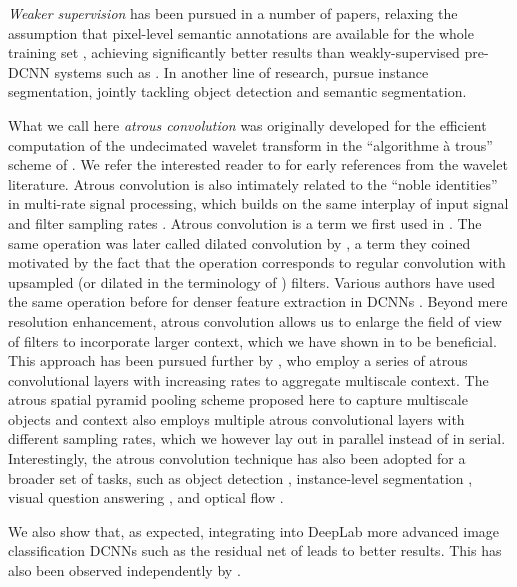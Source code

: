 \emph{Weaker supervision} has been pursued in a number of papers, relaxing
the assumption that pixel-level semantic annotations are available for the whole
training set \cite{pinheiro2014weakly, papandreou2015weakly, pathakICCV15ccnn, hong2015decoupled},
achieving significantly better results than weakly-supervised pre-DCNN systems
such as \cite{vezhnevets2011weakly}. In another line of research,
\cite{hariharan2014simultaneous, liang2015proposal} pursue instance segmentation, jointly tackling  object detection and semantic
segmentation.

What we call here \emph{atrous convolution} was originally developed for the efficient
computation of the undecimated wavelet transform in the ``algorithme \`a trous''
scheme of \cite{holschneider1989real}. We refer the interested reader to
\cite{fowler2005redundant} for early references from the wavelet literature.
Atrous convolution is also intimately related to the ``noble identities'' in
multi-rate signal processing, which builds on the same interplay of input signal
and filter sampling rates \cite{vaidyanathan1990multirate}. Atrous convolution
is a term we first used in \cite{papandreou2014untangling}. The same operation
was later called dilated convolution by \cite{yu2015multi}, a term they coined
motivated by the fact that the operation corresponds to regular convolution
with upsampled (or dilated in the terminology of \cite{holschneider1989real})
filters. Various authors have used the same operation before for denser feature
extraction in DCNNs \cite{giusti2013fast, sermanet2013overfeat, papandreou2014untangling}.
Beyond mere resolution enhancement, atrous convolution allows us to enlarge the
field of view of filters to incorporate larger context, which we have shown in
\cite{chen2014semantic} to be beneficial. This approach has been pursued further
by \cite{yu2015multi}, who employ a series of atrous convolutional layers with
increasing rates to aggregate multiscale context. The atrous spatial pyramid
pooling scheme proposed here to capture multiscale objects and context also
employs multiple atrous convolutional layers with different sampling rates,
which we however lay out in parallel instead of in serial.
Interestingly, the atrous convolution technique has also been adopted for a broader set of  tasks, such as object detection
 \cite{liu2015ssd,dai2016rfcn}, instance-level segmentation \cite{dai2016instance}, visual question answering \cite{chen2015abc}, and optical flow
 \cite{sevilla2016optical}.

We also show that, as expected, integrating into DeepLab more advanced image
classification DCNNs such as the residual net of \cite{he2015deep} leads to
better results. This has also been observed independently by \cite{wu2016high}.

